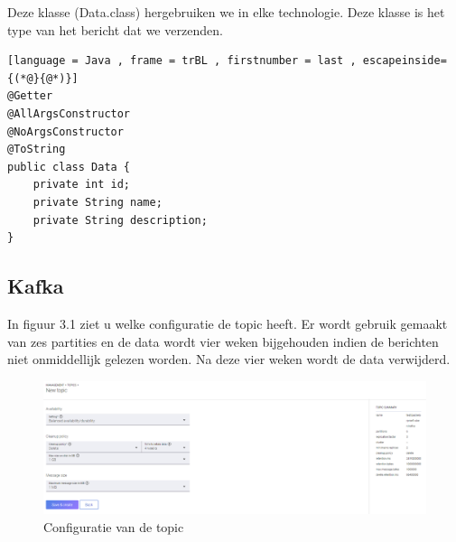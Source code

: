 Deze klasse (Data.class) hergebruiken we in elke technologie. Deze klasse is het type van het bericht dat we verzenden.
\begin{lstlisting}[language = Java , frame = trBL , firstnumber = last , escapeinside={(*@}{@*)}]
@Getter
@AllArgsConstructor
@NoArgsConstructor
@ToString
public class Data {
    private int id;
    private String name;
    private String description;
}
     \end{lstlisting}
\subsection{Kafka}
In figuur 3.1 ziet u welke configuratie de topic heeft. Er wordt gebruik gemaakt van zes partities en de data wordt vier weken bijgehouden indien de berichten niet onmiddellijk gelezen worden. Na deze vier weken wordt de data verwijderd.
\begin{figure}[h!]
    \centering
    \includegraphics[width=140mm]{../kafkaConfig.png}
    \caption{Configuratie van de topic}
    
\end{figure}
